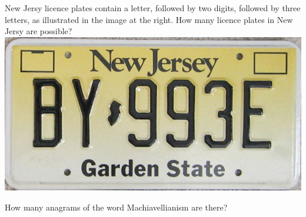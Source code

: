 \documentclass[answers,addpoints,12pt]{exam}
\begin{document}
\begin{questions}
\begin{multicols}{2}
\question
New Jersy licence plates contain a letter,
followed by two digits, followed by three letters,
as illustrated in the image at the right.
How many licence plates in New Jersy are possible?\\
\columnbreak
\includegraphics[scale=.3]{NewJersy}
\end{multicols}

\question How many anagrams of the word
{\textsf{Machiavellianism}} are there?

\end{questions}
\end{document}
